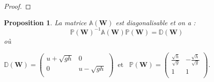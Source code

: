 \documentclass[
11pt, %
francais, %
singlespacing, %
headsepline, %
]{MastersDoctoralThesis} %
\newtheorem{prop}{Proposition}
\begin{document}
\begin{proof}

\end{proof}

\begin{prop}
La matrice $\mathbb{A}(\textbf{W})$ est diagonalisable et on a :
$$
\mathbb{P}(\textbf{W})^{-1}\mathbb{A}(\textbf{W})\mathbb{P}(\textbf{W})=\mathbb{D}(\textbf{W})
$$
où 

\begin{center}

$\mathbb{D}(\textbf{W}) =\begin{pmatrix}
   u+\sqrt{gh} & 0  \\
   0 & u-\sqrt{gh}  \\
\end{pmatrix} \phantom{..} \text{et}\phantom{...} \mathbb{P}(\textbf{W}) =\begin{pmatrix}
   \frac{\sqrt{h}}{\sqrt{g}} & -\frac{\sqrt{h}}{\sqrt{g}} \\
   1 & 1  \\
\end{pmatrix}.
$
\end{center}

\end{prop}
\end{document}

